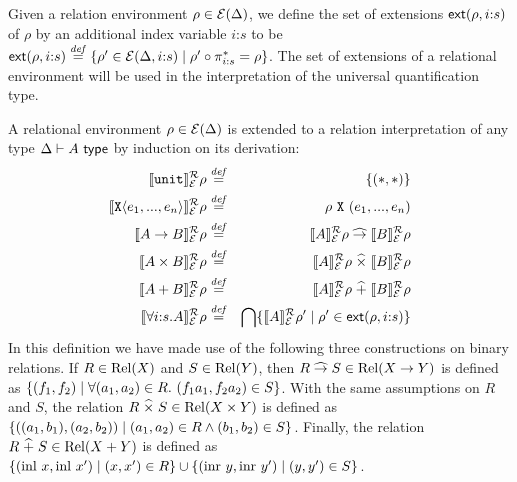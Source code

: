 Given a relation environment $\rho \in \mathcal{E}(\Delta)$, we define
the set of extensions $\mathsf{ext}(\rho,i\mathord:s)$ of $\rho$ by an
additional index variable $i\mathord:s$ to be
$\mathsf{ext}(\rho,i\mathord:s) \stackrel{\mathit{def}}= \{ \rho' \in
\mathcal{E}(\Delta,i\mathord:s) \mathrel| \rho' \circ \pi^*_{i\mathord:s}
= \rho \}$. The set of extensions of a relational environment will be
used in the interpretation of the universal quantification type.

A relational environment $\rho \in \mathcal{E}(\Delta)$ is extended to
a relation interpretation of any type $\Delta \vdash A \textsf{ type}$ by
induction on its derivation: %
\begin{eqnarray*}
  \llbracket \texttt{unit} \rrbracket^{\mathcal{R}}_{\mathcal{E}}{\rho} & \stackrel{\mathit{def}}= & \{(*,*)\} \\
  \llbracket \texttt{X}\langle e_1,...,e_n \rangle \rrbracket^{\mathcal{R}}_{\mathcal{E}}{\rho} & \stackrel{\mathit{def}}= & \rho\ {\texttt{X}}\ (e_1,...,e_n) \\
  \llbracket A \to B \rrbracket^{\mathcal{R}}_{\mathcal{E}}{\rho} & \stackrel{\mathit{def}}= & \llbracket A \rrbracket^{\mathcal{R}}_{\mathcal{E}}{\rho} \mathrel{\widehat\to} \llbracket B \rrbracket^{\mathcal{R}}_{\mathcal{E}}{\rho} \\
  \llbracket A \times B \rrbracket^{\mathcal{R}}_{\mathcal{E}}{\rho} & \stackrel{\mathit{def}}= & \llbracket A \rrbracket^{\mathcal{R}}_{\mathcal{E}}{\rho} \mathrel{\widehat\times} \llbracket B \rrbracket^{\mathcal{R}}_{\mathcal{E}}{\rho} \\
  \llbracket A + B \rrbracket^{\mathcal{R}}_{\mathcal{E}}{\rho} & \stackrel{\mathit{def}}= & \llbracket A \rrbracket^{\mathcal{R}}_{\mathcal{E}}{\rho} \mathrel{\widehat+} \llbracket B \rrbracket^{\mathcal{R}}_{\mathcal{E}}{\rho} \\
  \llbracket \forall i\mathord:s.A \rrbracket^{\mathcal{R}}_{\mathcal{E}}{\rho} & \stackrel{\mathit{def}}= & \bigcap\{ \llbracket A \rrbracket^{\mathcal{R}}_{\mathcal{E}}{\rho}' \mathrel| \rho' \in \mathsf{ext}(\rho,i\mathord:s) \}
\end{eqnarray*}
In this definition we have made use of the following three
constructions on binary relations. If $R \in \mathrm{Rel}(X)$ and $S \in
\mathrm{Rel}(Y)$, then $R \mathrel{\widehat\to} S \in \mathrm{Rel}(X \to Y)$ is defined as $\{
(f_1,f_2) \mathrel| \forall (a_1,a_2) \in R.\ (f_1a_1,f_2a_2) \in S
\}$. With the same assumptions on $R$ and $S$, the relation $R
\mathrel{\widehat\times} S \in \mathrm{Rel}(X \times Y)$ is defined as $\{
((a_1,b_1),(a_2,b_2)) \mathrel| (a_1,a_2) \in R \land (b_1,b_2) \in S
\}$. Finally, the relation $R \mathrel{\widehat+} S \in \mathrm{Rel}(X + Y)$ is defined as
$\{ (\mathrm{inl}\ x, \mathrm{inl}\ x') \mathrel| (x,x') \in R \} \cup
\{ (\mathrm{inr}\ y, \mathrm{inr}\ y') \mathrel| (y,y') \in S \}$.

